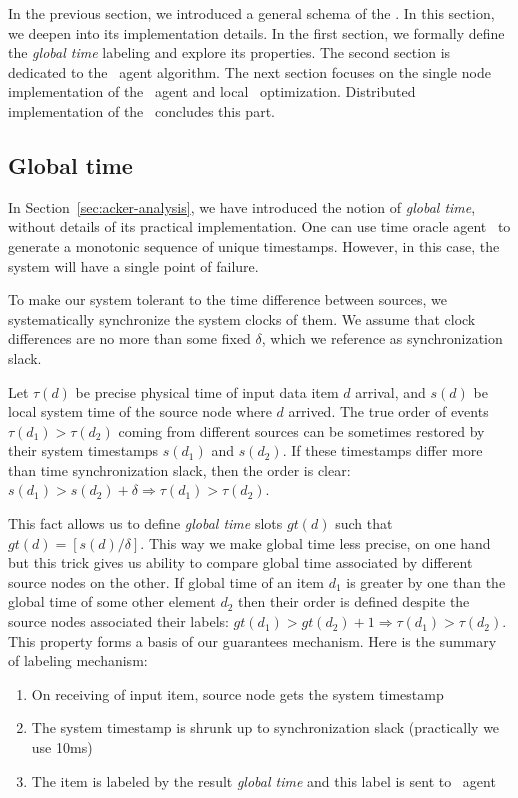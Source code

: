 \label {fs-acker-impl}

In the previous section, we introduced a general schema of the \tracker. In this section, we deepen into its implementation details. In the first section, we formally define the \textit{global time} labeling and explore its properties. The second section is dedicated to the \tracker\ agent algorithm. The next section focuses on the single node implementation of the \tracker\ agent and local \tracker\ optimization. Distributed implementation of the \tracker\ concludes this part.

\subsection{Global time}
In Section~\ref{sec:acker-analysis}, we have introduced the notion of \textit{global time}, without details of its practical implementation. One can use time oracle agent~\cite{10.14778/3055330.3055335} to generate a monotonic sequence of unique timestamps. However, in this case, the system will have a single point of failure. 

To make our system tolerant to the time difference between sources, we systematically synchronize the system clocks of them. We assume that clock differences are no more than some fixed $\delta$, which we reference as synchronization slack.

Let $\tau(d)$ be precise physical time of input data item $d$ arrival, and $s(d)$ be local system time of the source node where $d$ arrived. The true order of events $\tau(d_1) > \tau(d_2)$ coming from different sources can be sometimes restored by their system timestamps $s(d_1)$ and $s(d_2)$. If these timestamps differ more than time synchronization slack, then the order is clear: $s(d_1) > s(d_2) + \delta \Rightarrow \tau(d_1) > \tau(d_2)$.

This fact allows us to define \textit{global time} slots $gt(d)$ such that $gt(d) = [s(d) / \delta]$. This way we make global time less precise,  on one hand but this trick gives us ability to compare global time associated by different source nodes on the other. If global time of an item $d_1$ is greater by one than the global time of some other element $d_2$ then their order is defined despite the source nodes associated their labels:  $gt(d_1) > gt(d_2) + 1 \Rightarrow \tau(d_1) > \tau(d_2)$. This property forms a basis of our guarantees mechanism. Here is the summary of labeling mechanism:
\begin{enumerate}
    \item On receiving of input item, source node gets the system timestamp
    \item The system timestamp is shrunk up to synchronization slack (practically we use 10ms)
    \item The item is labeled by the result \textit{global time} and this label is sent to \tracker\ agent
\end{enumerate}

